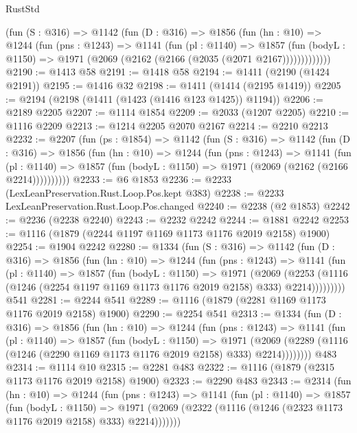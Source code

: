 \begin{lexlean}{RustStd}
\begin{coremodule}
        (fun (S : @316) =>
        @1142
          (fun (D : @316) =>
          @1856
            (fun (hn : @10) =>
            @1244
              (fun (pns : @1243) =>
              @1141
                (fun (pl : @1140) =>
                @1857
                  (fun (bodyL : @1150) =>
                  @1971 (@2069 (@2162 (@2166 (@2035 (@2071 @2167)))))))))))))
@2190 := @1413 @58
@2191 := @1418 @58
@2194 := @1411 (@2190 (@1424 @2191))
@2195 := @1416 @32
@2198 := @1411 (@1414 (@2195 @1419))
@2205 := @2194 (@2198 (@1411 (@1423 (@1416 @123 @1425)) @1194))
@2206 := @2189 @2205
@2207 := @1114 @1854
@2209 := @2033 (@1207 @2205)
@2210 := @1116 @2209
@2213 := @1214 @2205 @2070 @2167
@2214 := @2210 @2213
@2232 := @2207
    (fun (ps : @1854) =>
    @1142
      (fun (S : @316) =>
      @1142
        (fun (D : @316) =>
        @1856
          (fun (hn : @10) =>
          @1244
            (fun (pns : @1243) =>
            @1141
              (fun (pl : @1140) =>
              @1857 (fun (bodyL : @1150) => @1971 (@2069 (@2162 (@2166 @2214))))))))))
@2233 := @6 @1853
@2236 := @2233 (LexLeanPreservation.Rust.Loop.Pos.kept @383)
@2238 := @2233 LexLeanPreservation.Rust.Loop.Pos.changed
@2240 := @2238 (@2 @1853)
@2242 := @2236 (@2238 @2240)
@2243 := @2232 @2242
@2244 := @1881 @2242
@2253 := @1116 (@1879 (@2244 @1197 @1169 @1173 @1176 @2019 @2158) @1900)
@2254 := @1904 @2242
@2280 := @1334
    (fun (S : @316) =>
    @1142
      (fun (D : @316) =>
      @1856
        (fun (hn : @10) =>
        @1244
          (fun (pns : @1243) =>
          @1141
            (fun (pl : @1140) =>
            @1857
              (fun (bodyL : @1150) =>
              @1971
                (@2069
                  (@2253
                    (@1116 (@1246 (@2254 @1197 @1169 @1173 @1176 @2019 @2158) @333) @2214)))))))))
    @541
@2281 := @2244 @541
@2289 := @1116 (@1879 (@2281 @1169 @1173 @1176 @2019 @2158) @1900)
@2290 := @2254 @541
@2313 := @1334
    (fun (D : @316) =>
    @1856
      (fun (hn : @10) =>
      @1244
        (fun (pns : @1243) =>
        @1141
          (fun (pl : @1140) =>
          @1857
            (fun (bodyL : @1150) =>
            @1971
              (@2069 (@2289 (@1116 (@1246 (@2290 @1169 @1173 @1176 @2019 @2158) @333) @2214))))))))
    @483
@2314 := @1114 @10
@2315 := @2281 @483
@2322 := @1116 (@1879 (@2315 @1173 @1176 @2019 @2158) @1900)
@2323 := @2290 @483
@2343 := @2314
    (fun (hn : @10) =>
    @1244
      (fun (pns : @1243) =>
      @1141
        (fun (pl : @1140) =>
        @1857
          (fun (bodyL : @1150) =>
          @1971 (@2069 (@2322 (@1116 (@1246 (@2323 @1173 @1176 @2019 @2158) @333) @2214)))))))

\end{coremodule}
\end{lexlean}

